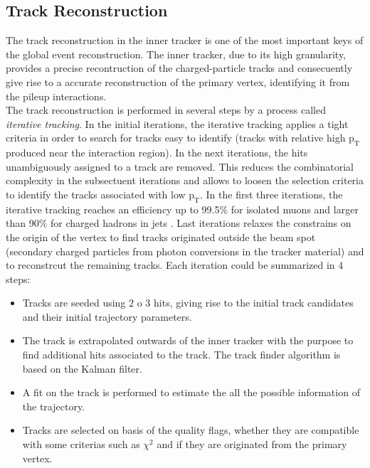 
\subsection{Track Reconstruction}
\label{subsec:TrackReco}
The track reconstruction in the inner tracker is one of the most important keys of the global event reconstruction. The inner tracker, due to its
high granularity, provides a precise recontruction of the charged-particle tracks and consecuently give rise to a accurate reconstruction 
of the primary vertex, identifying it from the pileup interactions. \\

The track reconstruction is performed in several steps by a process called \textit{iterative tracking}. In the initial iterations, 
the iterative tracking applies a tight criteria in order to search for tracks easy to identify (tracks 
with relative high $\textrm{p}_{\textrm{T}}$ produced near the interaction region). In the next iterations, the hits 
unambiguously assigned to a track are removed. This reduces the combinatorial complexity in the subsectuent iterations 
and allows to loosen the selection criteria to identify the tracks associated with low $\textrm{p}_{\textrm{T}}$. In the first three iterations, 
the iterative tracking reaches an efficiency up to 99.5$\%$ for isolated muons and larger than 90$\%$ for 
charged hadrons in jets \cite{CMS-PAS-PFT-09-001}. Last iterations relaxes the constrains on the origin of the vertex 
to find tracks originated outside the beam spot (secondary charged particles from photon conversions in the tracker material) 
and to reconstrcut the remaining tracks. Each iteration could be summarized in 4 steps:\\

\begin{itemize}
 \item Tracks are seeded using 2 o 3 hits, giving rise to the initial track candidates and their initial trajectory parameters.
 \item The track is extrapolated outwards of the inner tracker with the purpose to find additional hits associated to the track. The track finder 
 algorithm is based on the Kalman filter.
 \item A fit on the track is performed to estimate the all the possible information of the trajectory.
 \item Tracks are selected on basis of the quality flags, whether they are compatible with some 
 criterias such as $\chi^{2}$ and if they are originated from the primary vertex.
\end{itemize}

